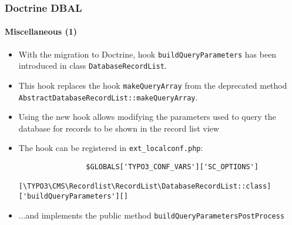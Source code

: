 \begin{frame}[fragile]
	\frametitle{Doctrine DBAL}
	\framesubtitle{Miscellaneous (1)}

	\lstset{basicstyle=\tiny\ttfamily}

	\begin{itemize}

		\item With the migration to Doctrine, hook \texttt{buildQueryParameters} has been introduced in class
			\texttt{DatabaseRecordList}.

		\item This hook replaces the hook \texttt{makeQueryArray} from the deprecated method
			\texttt{AbstractDatabaseRecordList::makeQueryArray}.

		\item Using the new hook allows modifying the parameters used to query the database for records
			to be shown in the record list view

		\item The hook can be registered in \texttt{ext\_localconf.php}:

			\begin{lstlisting}
				$GLOBALS['TYPO3_CONF_VARS']['SC_OPTIONS']
				  [\TYPO3\CMS\Recordlist\RecordList\DatabaseRecordList::class]['buildQueryParameters'][]
			\end{lstlisting}

		\item ...and implements the public method \texttt{buildQueryParametersPostProcess}

	\end{itemize}

\end{frame}


